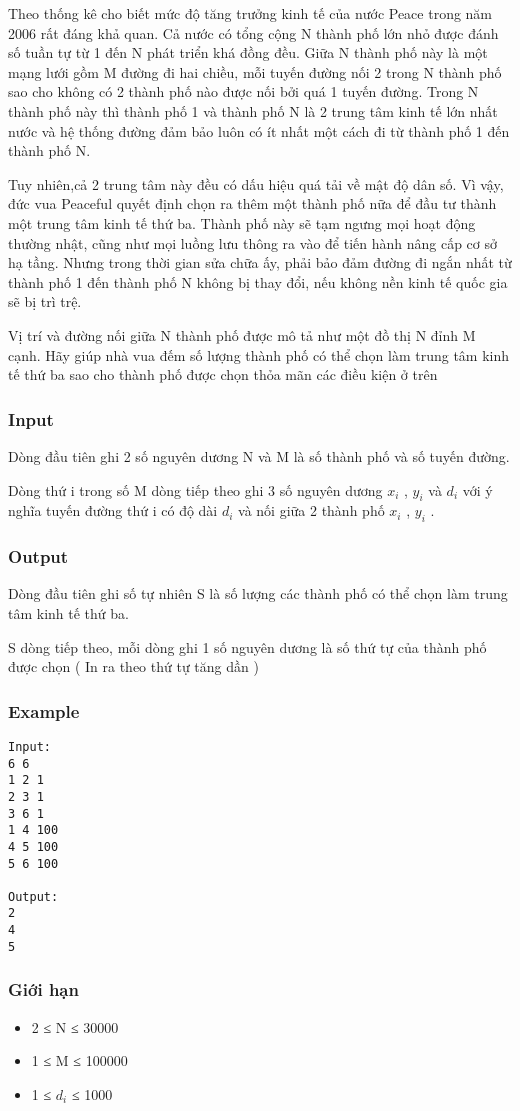 



   Theo thống kê cho biết mức độ tăng trưởng kinh tế của nước Peace trong năm 2006 rất đáng khả quan. Cả nước có tổng cộng N thành phố lớn nhỏ  được đánh số tuần tự từ 1 đến N phát triển khá đồng đều. Giữa N thành phố này là một mạng lưới gồm M đường đi hai chiều, mỗi tuyến đường nối 2 trong N thành phố sao cho không có 2 thành phố nào được nối bởi quá 1 tuyến đường. Trong N thành phố này thì thành phố 1 và thành phố N là 2 trung tâm kinh tế lớn nhất nước và hệ thống đường đảm bảo luôn có ít nhất một cách đi từ thành phố 1 đến thành phố N.  



   Tuy nhiên,cả 2 trung tâm này đều có dấu hiệu quá tải về mật độ dân số. Vì vậy, đức vua Peaceful quyết định chọn ra thêm một thành phố nữa để đầu tư thành một trung tâm kinh tế thứ ba. Thành phố này sẽ tạm ngưng mọi hoạt động thường nhật, cũng như mọi luồng lưu thông ra vào để tiến hành nâng cấp cơ sở hạ tầng. Nhưng trong thời gian sửa chữa ấy, phải bảo đảm đường đi ngắn nhất từ thành phố 1 đến thành phố N không bị thay đổi, nếu không nền kinh tế quốc gia sẽ bị trì trệ.  



   Vị trí và đường nối giữa N thành phố được mô tả như một đồ thị N đỉnh M cạnh. Hãy giúp nhà vua đếm số lượng thành phố có thể chọn làm trung tâm kinh tế thứ ba sao cho thành phố được chọn thỏa mãn các điều kiện ở trên  

\subsubsection{   Input  }

   Dòng đầu tiên ghi 2 số nguyên dương N và M là số thành phố và số tuyến đường.  

   Dòng thứ i trong số M dòng tiếp theo ghi 3 số nguyên dương $x_{i}$   , $y_{i}$   và $d_{i}$   với ý nghĩa tuyến đường thứ i có độ dài $d_{i}$   và nối giữa 2 thành phố $x_{i}$   , $y_{i}$   .  

\subsubsection{   Output  }

   Dòng đầu tiên ghi số tự nhiên S là số lượng các thành phố có thể chọn làm trung tâm kinh tế thứ ba.  

   S dòng tiếp theo, mỗi dòng ghi 1 số nguyên dương là số thứ tự của thành phố được chọn ( In ra theo thứ tự tăng dần )  

\subsubsection{   Example  }
\begin{verbatim}
Input:
6 6
1 2 1
2 3 1
3 6 1
1 4 100
4 5 100
5 6 100

Output:
2
4 
5

\end{verbatim}

\subsubsection{   Giới hạn  }
\begin{itemize}
	\item     2 ≤ N ≤ 30000   
	\item     1 ≤ M ≤ 100000   
	\item     1 ≤ $d_{i}$    ≤ 1000   
\end{itemize}

